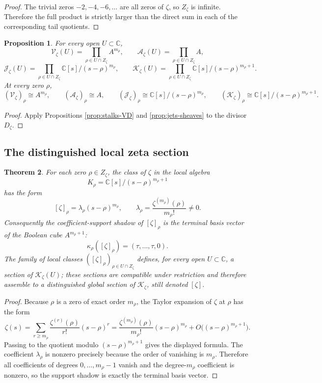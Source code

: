 \documentclass[11pt,a4paper]{article}
\newtheorem{theorem}{Theorem}[section]
\newtheorem{proposition}[theorem]{Proposition}
\theoremstyle{definition}
\theoremstyle{remark}
\newcommand{\CC}{\mathbb C}
\newcommand{\Vzet}{\mathcal V_{\zeta}}
\newcommand{\Azet}{\mathcal A_{\zeta}}
\newcommand{\Jzet}{\mathcal J_{\zeta}}
\newcommand{\Kzet}{\mathcal K_{\zeta}}
\newcommand{\taup}{\tau}
\begin{document}
\begin{proof}
The trivial zeros $-2,-4,-6,\dots$ are all zeros of $\zeta$, so $Z_\zeta$ is infinite.  Therefore the full product is strictly larger than the direct sum in each of the corresponding tail quotients.
\end{proof}

\begin{proposition}\label{prop:zeta-sheaf-formulas}
For every open $U\subset\CC$,
\[
\Vzet(U)=\prod_{\rho\in U\cap Z_\zeta}A^{m_\rho},
\qquad
\Azet(U)=\prod_{\rho\in U\cap Z_\zeta}A,
\]
\[
\Jzet(U)=\prod_{\rho\in U\cap Z_\zeta}\CC[s]/(s-\rho)^{m_\rho},
\qquad
\Kzet(U)=\prod_{\rho\in U\cap Z_\zeta}\CC[s]/(s-\rho)^{m_\rho+1}.
\]
At every zero $\rho$,
\[
(\Vzet)_\rho\cong A^{m_\rho},
\qquad
(\Azet)_\rho\cong A,
\qquad
(\Jzet)_\rho\cong \CC[s]/(s-\rho)^{m_\rho},
\qquad
(\Kzet)_\rho\cong \CC[s]/(s-\rho)^{m_\rho+1}.
\]
\end{proposition}

\begin{proof}
Apply Propositions \ref{prop:stalks-VD} and \ref{prop:jets-sheaves} to the divisor $D_\zeta$.
\end{proof}

\subsection{The distinguished local zeta section}

\begin{theorem}\label{thm:distinguished-zeta-section}
For each zero $\rho\in Z_\zeta$, the class of $\zeta$ in the local algebra
\[
K_\rho=\CC[s]/(s-\rho)^{m_\rho+1}
\]
has the form
\[
[\zeta]_\rho=\lambda_\rho (s-\rho)^{m_\rho},
\qquad
\lambda_\rho=\frac{\zeta^{(m_\rho)}(\rho)}{m_\rho!}\neq0.
\]
Consequently the coefficient-support shadow of $[\zeta]_\rho$ is the terminal basis vector of the Boolean cube $A^{m_\rho+1}$:
\[
\kappa_\rho([\zeta]_\rho)=(\taup,\dots,\taup,0).
\]
The family of local classes $([\zeta]_\rho)_{\rho\in U\cap Z_\zeta}$ defines, for every open $U\subset\CC$, a section of $\Kzet(U)$; these sections are compatible under restriction and therefore assemble to a distinguished global section of $\Kzet$, still denoted $[\zeta]$.
\end{theorem}

\begin{proof}
Because $\rho$ is a zero of exact order $m_\rho$, the Taylor expansion of $\zeta$ at $\rho$ has the form
\[
\zeta(s)=\sum_{r\ge m_\rho} \frac{\zeta^{(r)}(\rho)}{r!}(s-\rho)^r
=\frac{\zeta^{(m_\rho)}(\rho)}{m_\rho!}(s-\rho)^{m_\rho}+O\bigl((s-\rho)^{m_\rho+1}\bigr).
\]
Passing to the quotient modulo $(s-\rho)^{m_\rho+1}$ gives the displayed formula.  The coefficient $\lambda_\rho$ is nonzero precisely because the order of vanishing is $m_\rho$.  Therefore all coefficients of degrees $0,\dots,m_\rho-1$ vanish and the degree-$m_\rho$ coefficient is nonzero, so the support shadow is exactly the terminal basis vector.
\end{proof}
\end{document}

